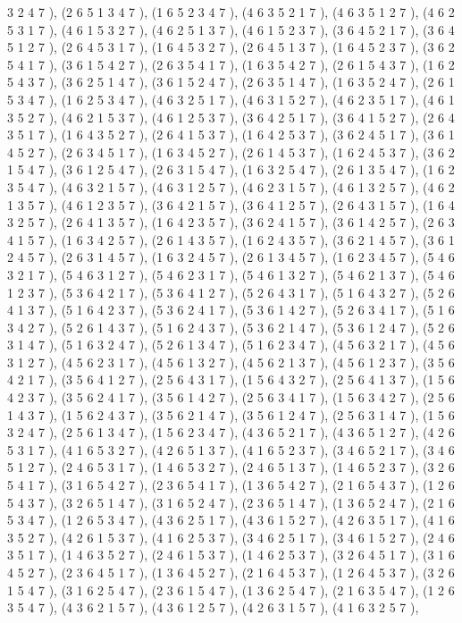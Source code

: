 \documentclass[12pt]{article}
\begin{document}
\begin{enumerate}
3 2 4 7  ), (2 6 5 1 3 4 7  ), (1 6 5 2 3 4 7  ), (4 6 3 5 2 1 7  ), (4 6 3 5 1 2 7  ), (4 6 2 5 3 1 7  ), (4 6 1 5 3 2 7  ), (4 6 2 5 1 3 7  ), (4 6 1 5 2 3 7  ), (3 6 4 5 2 1 7  ), (3 6 4 5 1 2 7  ), (2 6 4 5 3 1 7  ), (1 6 4 5 3 2 7  ), (2 6 4 5 1 3 7  ), (1 6 4 5 2 3 7  ), (3 6 2 5 4 1 7  ), (3 6 1 5 4 2 7  ), (2 6 3 5 4 1 7  ), (1 6 3 5 4 2 7  ), (2 6 1 5 4 3 7  ), (1 6 2 5 4 3 7  ), (3 6 2 5 1 4 7  ), (3 6 1 5 2 4 7  ), (2 6 3 5 1 4 7  ), (1 6 3 5 2 4 7  ), (2 6 1 5 3 4 7  ), (1 6 2 5 3 4 7  ), (4 6 3 2 5 1 7  ), (4 6 3 1 5 2 7  ), (4 6 2 3 5 1 7  ), (4 6 1 3 5 2 7  ), (4 6 2 1 5 3 7  ), (4 6 1 2 5 3 7  ), (3 6 4 2 5 1 7  ), (3 6 4 1 5 2 7  ), (2 6 4 3 5 1 7  ), (1 6 4 3 5 2 7  ), (2 6 4 1 5 3 7  ), (1 6 4 2 5 3 7  ), (3 6 2 4 5 1 7  ), (3 6 1 4 5 2 7  ), (2 6 3 4 5 1 7  ), (1 6 3 4 5 2 7  ), (2 6 1 4 5 3 7  ), (1 6 2 4 5 3 7  ), (3 6 2 1 5 4 7  ), (3 6 1 2 5 4 7  ), (2 6 3 1 5 4 7  ), (1 6 3 2 5 4 7  ), (2 6 1 3 5 4 7  ), (1 6 2 3 5 4 7  ), (4 6 3 2 1 5 7  ), (4 6 3 1 2 5 7  ), (4 6 2 3 1 5 7  ), (4 6 1 3 2 5 7  ), (4 6 2 1 3 5 7  ), (4 6 1 2 3 5 7  ), (3 6 4 2 1 5 7  ), (3 6 4 1 2 5 7  ), (2 6 4 3 1 5 7  ), (1 6 4 3 2 5 7  ), (2 6 4 1 3 5 7  ), (1 6 4 2 3 5 7  ), (3 6 2 4 1 5 7  ), (3 6 1 4 2 5 7  ), (2 6 3 4 1 5 7  ), (1 6 3 4 2 5 7  ), (2 6 1 4 3 5 7  ), (1 6 2 4 3 5 7  ), (3 6 2 1 4 5 7  ), (3 6 1 2 4 5 7  ), (2 6 3 1 4 5 7  ), (1 6 3 2 4 5 7  ), (2 6 1 3 4 5 7  ), (1 6 2 3 4 5 7  ), (5 4 6 3 2 1 7  ), (5 4 6 3 1 2 7  ), (5 4 6 2 3 1 7  ), (5 4 6 1 3 2 7  ), (5 4 6 2 1 3 7  ), (5 4 6 1 2 3 7  ), (5 3 6 4 2 1 7  ), (5 3 6 4 1 2 7  ), (5 2 6 4 3 1 7  ), (5 1 6 4 3 2 7  ), (5 2 6 4 1 3 7  ), (5 1 6 4 2 3 7  ), (5 3 6 2 4 1 7  ), (5 3 6 1 4 2 7  ), (5 2 6 3 4 1 7  ), (5 1 6 3 4 2 7  ), (5 2 6 1 4 3 7  ), (5 1 6 2 4 3 7  ), (5 3 6 2 1 4 7  ), (5 3 6 1 2 4 7  ), (5 2 6 3 1 4 7  ), (5 1 6 3 2 4 7  ), (5 2 6 1 3 4 7  ), (5 1 6 2 3 4 7  ), (4 5 6 3 2 1 7  ), (4 5 6 3 1 2 7  ), (4 5 6 2 3 1 7  ), (4 5 6 1 3 2 7  ), (4 5 6 2 1 3 7  ), (4 5 6 1 2 3 7  ), (3 5 6 4 2 1 7  ), (3 5 6 4 1 2 7  ), (2 5 6 4 3 1 7  ), (1 5 6 4 3 2 7  ), (2 5 6 4 1 3 7  ), (1 5 6 4 2 3 7  ), (3 5 6 2 4 1 7  ), (3 5 6 1 4 2 7  ), (2 5 6 3 4 1 7  ), (1 5 6 3 4 2 7  ), (2 5 6 1 4 3 7  ), (1 5 6 2 4 3 7  ), (3 5 6 2 1 4 7  ), (3 5 6 1 2 4 7  ), (2 5 6 3 1 4 7  ), (1 5 6 3 2 4 7  ), (2 5 6 1 3 4 7  ), (1 5 6 2 3 4 7  ), (4 3 6 5 2 1 7  ), (4 3 6 5 1 2 7  ), (4 2 6 5 3 1 7  ), (4 1 6 5 3 2 7  ), (4 2 6 5 1 3 7  ), (4 1 6 5 2 3 7  ), (3 4 6 5 2 1 7  ), (3 4 6 5 1 2 7  ), (2 4 6 5 3 1 7  ), (1 4 6 5 3 2 7  ), (2 4 6 5 1 3 7  ), (1 4 6 5 2 3 7  ), (3 2 6 5 4 1 7  ), (3 1 6 5 4 2 7  ), (2 3 6 5 4 1 7  ), (1 3 6 5 4 2 7  ), (2 1 6 5 4 3 7  ), (1 2 6 5 4 3 7  ), (3 2 6 5 1 4 7  ), (3 1 6 5 2 4 7  ), (2 3 6 5 1 4 7  ), (1 3 6 5 2 4 7  ), (2 1 6 5 3 4 7  ), (1 2 6 5 3 4 7  ), (4 3 6 2 5 1 7  ), (4 3 6 1 5 2 7  ), (4 2 6 3 5 1 7  ), (4 1 6 3 5 2 7  ), (4 2 6 1 5 3 7  ), (4 1 6 2 5 3 7  ), (3 4 6 2 5 1 7  ), (3 4 6 1 5 2 7  ), (2 4 6 3 5 1 7  ), (1 4 6 3 5 2 7  ), (2 4 6 1 5 3 7  ), (1 4 6 2 5 3 7  ), (3 2 6 4 5 1 7  ), (3 1 6 4 5 2 7  ), (2 3 6 4 5 1 7  ), (1 3 6 4 5 2 7  ), (2 1 6 4 5 3 7  ), (1 2 6 4 5 3 7  ), (3 2 6 1 5 4 7  ), (3 1 6 2 5 4 7  ), (2 3 6 1 5 4 7  ), (1 3 6 2 5 4 7  ), (2 1 6 3 5 4 7  ), (1 2 6 3 5 4 7  ), (4 3 6 2 1 5 7  ), (4 3 6 1 2 5 7  ), (4 2 6 3 1 5 7  ), (4 1 6 3 2 5 7  ), 
\end{enumerate}
\end{document}
